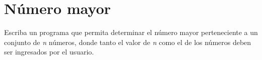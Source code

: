 \section{Número mayor}

Escriba un programa que permita determinar el número mayor perteneciente
a un conjunto de \emph{n} números, donde tanto el valor de \emph{n} como
el de los números deben ser ingresados por el usuario.
